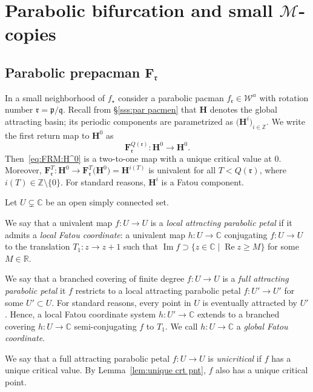 \documentclass{amsart}
\newcommand{\1}{{\mathbb 1 }}
\renewcommand{\Re}{\operatorname {Re}}
\renewcommand{\Im}{\operatorname {Im}}
\newcommand{\Mandel}{{\mathcal{M}}}
\newcommand{\bF}{{\mathbf F}}
\newcommand{\bH}{{\mathbf H}}
\newcommand{\str}{{\star}}
\newcommand{\pp}{\mathfrak{p}}
\renewcommand{\qq}{\mathfrak{q}}
\newcommand{\rr}{\mathfrak{r}}
\newcommand\WW{\mathcal{W}}
\newcommand{\C}{\mathbb{C}}
\newcommand{\R}{\mathbb{R}}
\newcommand{\Z}{\mathbb{Z}}
\theoremstyle{remark}
\numberwithin{equation}{section}
\theoremstyle{definition}
\theoremstyle{nonumberbreak}
\begin{document}
\section{Parabolic bifurcation and small $\boldsymbol\Mandel$-copies}
\label{s:par pacm}

\subsection{Parabolic prepacman $\bF_\rr$}
\label{ss:par pacm:bF rr}
In a small neighborhood of $f_\str$ consider a parabolic pacman $f_\rr\in \WW^u$  with rotation number $\rr=\pp/\qq$. Recall from \S\ref{sss:par pacmen} that $\bH$ denotes the global attracting basin; its periodic components are parametrized as $\big(\bH^i\big)_{i\in \Z}$. We write the first return map to $\bH^0$ as 
 \begin{equation}
\label{eq:FRM:H^0}
 \bF_\rr^{Q(\rr)}\colon \bH^0\to\bH^0.
 \end{equation}
Then~\eqref{eq:FRM:H^0} is a two-to-one map with a unique critical value at $0$.  Moreover, $\bF_\rr^T\colon  \bH^0\to  \bF_\rr^T\big(\bH^0\big)=\bH^{i(T)}$ is univalent for all $T<Q(\rr)$, where $i(T)\in \Z\setminus\{0\}$. For standard reasons, $\bH^i$ is a Fatou component. 



Let $U\subsetneq \C$ be an open simply connected set. 

We say that a univalent map $f\colon U\to U$ is a \emph{local attracting parabolic petal} if it admits a \emph{local Fatou coordinate}: a univalent map $h\colon U\to \C$ conjugating $f\colon U\to U$ to the translation $T_1\colon z\to z+1$ such that $\Im f \supset \{z\in \C \mid \Re z\ge M\}$ for some $M\in \R$. 

 We say that a branched covering of finite degree $f\colon U\to U$ is a \emph{full attracting parabolic petal} it $f$ restricts to a local attracting parabolic petal $f:U'\to U'$ for some $U'\subset U$. For standard reasons, every point in $U$ is eventually attracted by $U'$. Hence, a local Fatou coordinate system $h\colon U'\to \C$ extends to a branched covering $h\colon U\to \C$ semi-conjugating $f$ to $T_1$. We call $h\colon U\to \C$ a \emph{global Fatou coordinate}.
 


We say that a full attracting parabolic petal $f\colon U\to U$ is \emph{unicritical} if $f$ has a unique critical value. By Lemma~\ref{lem:unique crt pnt}, $f$ also has a unique critical point. 
\end{document}
